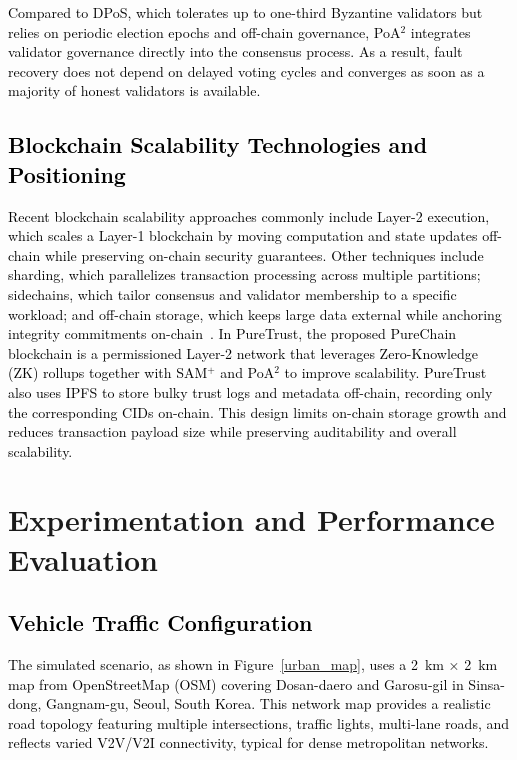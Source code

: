 \cite{cho2010survey}\documentclass[journal,comsoc,twoside]{IEEEtran}
\begin{document}
\textcolor{black}{
Compared to DPoS, which tolerates up to one-third Byzantine validators but relies on periodic election epochs and off-chain governance, PoA$^2$ integrates validator governance directly into the consensus process. As a result, fault recovery does not depend on delayed voting cycles and converges as soon as a majority of honest validators is available.}

\textcolor{black}{
\subsection{Blockchain Scalability Technologies and Positioning}
Recent blockchain scalability approaches commonly include Layer-2 execution, which scales a Layer-1 blockchain by moving computation and state updates off-chain while preserving on-chain security guarantees. Other techniques include sharding, which parallelizes transaction processing across multiple partitions; sidechains, which tailor consensus and validator membership to a specific workload; and off-chain storage, which keeps large data external while anchoring integrity commitments on-chain~\cite{lincopinis2024current}. In PureTrust, the proposed PureChain blockchain is a permissioned Layer-2 network that leverages Zero-Knowledge (ZK) rollups together with SAM$^{+}$ and PoA$^{2}$ to improve scalability. PureTrust also uses IPFS to store bulky trust logs and metadata off-chain, recording only the corresponding CIDs on-chain. This design limits on-chain storage growth and reduces transaction payload size while preserving auditability and overall scalability.}


\section{Experimentation and Performance Evaluation}
\textcolor{black}{
\subsection{Vehicle Traffic Configuration}
The simulated scenario, as shown in Figure~\ref{urban_map}, uses a 2~km × 2~km map from OpenStreetMap (OSM) covering Dosan-daero and Garosu-gil in Sinsa-dong, Gangnam-gu, Seoul, South Korea. This network map provides a realistic road topology featuring multiple intersections, traffic lights, multi-lane roads, and reflects varied V2V/V2I connectivity, typical for dense metropolitan networks.}
\end{document}
